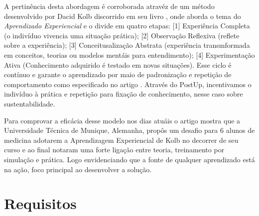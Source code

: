 \documentclass[
  12pt,
  a4paper,
  oneside,
  chapter=TITLE,
  section=TITLE,
  brazil
]{abntex2}
\begin{document}
A pertinência desta abordagem é corroborada atravéz de um método desenvolvido por Dacid Kolb discorrido em seu livro , onde aborda o tema do \textit{Aprendizado Experiencial} e o divide em quatro etapas: [1] Experiência Completa (o indivíduo vivencia uma situação prática); [2] Observação Reflexiva (reflete sobre a experiência); [3] Conceitusalização Abstrata (experiência transmformada em conceitos, teorias ou modelos mentáis para entendimento); [4] Experimentação Ativa (Conhecimento adquirido é testado em novas situações). Esse ciclo é contínuo e garante o aprendizado por maio de padronização e repetição de comportamento como especificado no artigo . Através do PostUp, incentivamos o indivíduo à prática e repetição para fixação de conhecimento, nesse caso sobre sustentabilidade.

Para comprovar a eficácia desse modelo nos dias atuáis o artigo  mostra que a Universidade Técnica de Munique, Alemanha, propôs um desafio para 6 alunos de medicina adotarem a Aprendizagem Experiencial de Kolb no decorrer de seu curso e ao final notaram uma forte ligação entre teoria, treinamento por simulação e prática. Logo envidenciando que a fonte de qualquer aprendizado está na ação, foco principal ao desenvolver a solução.

\chapter{Requisitos}
\end{document}
